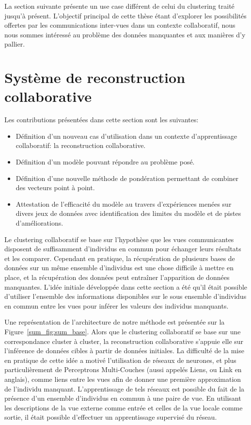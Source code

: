    La section suivante présente un use case différent de celui du clustering traité jusqu'à présent. L'objectif principal de cette thèse étant d'explorer les possibilités offertes par les communications inter-vues dans un contexte collaboratif, nous nous sommes intéressé au problème des données manquantes et aux manières d'y pallier.

\section{Système de reconstruction collaborative}

Les contributions présentées dans cette section sont les suivantes:
\begin{itemize}
    \item Définition d'un nouveau cas d'utilisation dans un contexte d'apprentissage collaboratif: la reconstruction collaborative.
    \item Définition d'un modèle pouvant répondre au problème posé.
    \item Définition d'une nouvelle méthode de pondération permettant de combiner des vecteurs point à point.
    \item Attestation de l'efficacité du modèle au travers d'expériences menées sur divers jeux de données avec identification des limites du modèle et de pistes d'améliorations.
\end{itemize}

Le clustering collaboratif se base sur l'hypothèse que les vues communicantes disposent de suffisamment d'individus en commun pour échanger leurs résultats et les comparer. Cependant en pratique, la récupération de plusieurs bases de données sur un même ensemble d'individus est une chose difficile à mettre en place, et la récupération des données peut entraîner l'apparition de données manquantes. L'idée initiale développée dans cette section a été qu'il était possible d'utiliser l'ensemble des informations disponibles sur le sous ensemble d'individus en commun entre les vues pour inférer les valeurs des individus manquants.

Une représentation de l'architecture de notre méthode est présentée sur la Figure~\ref{sum_fig:sum_base}. Alors que le clustering collaboratif se base sur une correspondance cluster à cluster, la reconstruction collaborative s'appuie elle sur l'inférence de données cibles à partir de données initiales. La difficulté de la mise en pratique de cette idée a motivé l'utilisation de réseaux de neurones, et plus particulièrement de Perceptrons Multi-Couches (aussi appelés Liens, ou Link en anglais), comme liens entre les vues afin de donner une première approximation de l'individu manquant. L'apprentissage de tels réseaux est possible du fait de la présence d'un ensemble d'individus en commun à une paire de vue. En utilisant les descriptions de la vue externe comme entrée et celles de la vue locale comme sortie, il était possible d'effectuer un apprentissage supervisé du réseau.

